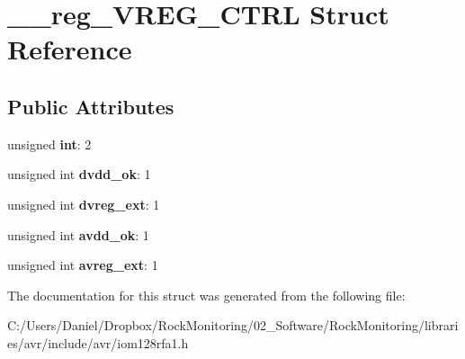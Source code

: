 \hypertarget{struct____reg___v_r_e_g___c_t_r_l}{}\section{\+\_\+\+\_\+reg\+\_\+\+V\+R\+E\+G\+\_\+\+C\+T\+RL Struct Reference}
\label{struct____reg___v_r_e_g___c_t_r_l}
\subsection*{Public Attributes}
\begin{DoxyCompactItemize}
\item 
unsigned {\bfseries int}\+: 2\hypertarget{struct____reg___v_r_e_g___c_t_r_l_a7269904846b30a4c1eb801a7179a5ce2}{}\label{struct____reg___v_r_e_g___c_t_r_l_a7269904846b30a4c1eb801a7179a5ce2}

\item 
unsigned int {\bfseries dvdd\+\_\+ok}\+: 1\hypertarget{struct____reg___v_r_e_g___c_t_r_l_abc1a1fb4ac23290132ed65e01c3646c7}{}\label{struct____reg___v_r_e_g___c_t_r_l_abc1a1fb4ac23290132ed65e01c3646c7}

\item 
unsigned int {\bfseries dvreg\+\_\+ext}\+: 1\hypertarget{struct____reg___v_r_e_g___c_t_r_l_a3f6c6ddb494708b0a6c229d4729fb79c}{}\label{struct____reg___v_r_e_g___c_t_r_l_a3f6c6ddb494708b0a6c229d4729fb79c}

\item 
unsigned int {\bfseries avdd\+\_\+ok}\+: 1\hypertarget{struct____reg___v_r_e_g___c_t_r_l_a8cf9cfe3701e9ac188b31043846dd24a}{}\label{struct____reg___v_r_e_g___c_t_r_l_a8cf9cfe3701e9ac188b31043846dd24a}

\item 
unsigned int {\bfseries avreg\+\_\+ext}\+: 1\hypertarget{struct____reg___v_r_e_g___c_t_r_l_a3d4a5c529df5164792e04f95c42052ea}{}\label{struct____reg___v_r_e_g___c_t_r_l_a3d4a5c529df5164792e04f95c42052ea}

\end{DoxyCompactItemize}


The documentation for this struct was generated from the following file\+:\begin{DoxyCompactItemize}
\item 
C\+:/\+Users/\+Daniel/\+Dropbox/\+Rock\+Monitoring/02\+\_\+\+Software/\+Rock\+Monitoring/libraries/avr/include/avr/iom128rfa1.\+h\end{DoxyCompactItemize}
